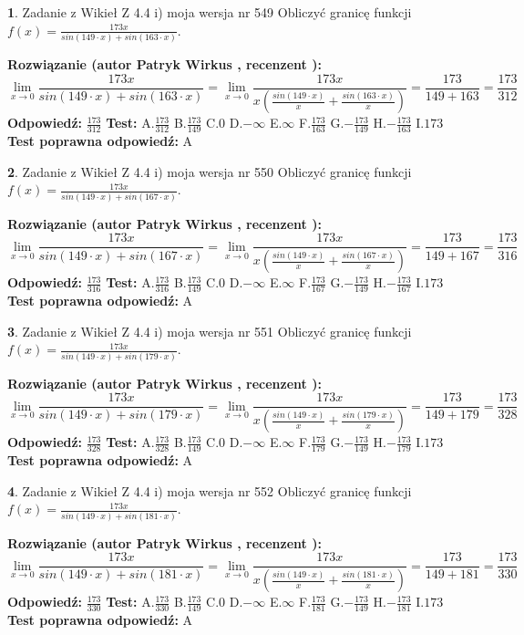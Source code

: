 \documentclass[12pt, a4paper]{article}
\theoremstyle{definition} %
\newtheorem{zad}{}
\newcommand{\zadStart}[1]{\begin{zad}#1\newline}
\newcommand{\zadStop}{\end{zad}}
\newcommand{\rozwStart}[2]{\noindent \textbf{Rozwiązanie (autor #1 , recenzent #2): }\newline}
\newcommand{\rozwStop}{\newline}
\newcommand{\odpStart}{\noindent \textbf{Odpowiedź:}\newline}
\newcommand{\odpStop}{\newline}
\newcommand{\testStart}{\noindent \textbf{Test:}\newline}
\newcommand{\testStop}{\newline}
\newcommand{\kluczStart}{\noindent \textbf{Test poprawna odpowiedź:}\newline}
\newcommand{\kluczStop}{\newline}
\begin{document}
\zadStart{Zadanie z Wikieł Z 4.4 i) moja wersja nr 549}
Obliczyć granicę funkcji $f(x)=\frac{173x}{sin(149\cdot x) +sin(163\cdot x)}$.
\zadStop
\rozwStart{Patryk Wirkus}{}
$$\lim\limits_{x\to 0}\frac{173x}{sin(149\cdot x) +sin(163\cdot x)}=\lim\limits_{x\to 0}\frac{173x}{x(\frac{sin(149\cdot x)}{x}+\frac{sin(163\cdot x)}{x})}=\frac{173}{149+163} = \frac{173}{312}$$
\rozwStop
\odpStart
$\frac{173}{312}$
\odpStop
\testStart
A.$\frac{173}{312}$
B.$\frac{173}{149}$
C.$0$
D.$-\infty$
E.$\infty$
F.$\frac{173}{163}$
G.$-\frac{173}{149}$
H.$-\frac{173}{163}$
I.$173$
\testStop
\kluczStart
A
\kluczStop



\zadStart{Zadanie z Wikieł Z 4.4 i) moja wersja nr 550}
Obliczyć granicę funkcji $f(x)=\frac{173x}{sin(149\cdot x) +sin(167\cdot x)}$.
\zadStop
\rozwStart{Patryk Wirkus}{}
$$\lim\limits_{x\to 0}\frac{173x}{sin(149\cdot x) +sin(167\cdot x)}=\lim\limits_{x\to 0}\frac{173x}{x(\frac{sin(149\cdot x)}{x}+\frac{sin(167\cdot x)}{x})}=\frac{173}{149+167} = \frac{173}{316}$$
\rozwStop
\odpStart
$\frac{173}{316}$
\odpStop
\testStart
A.$\frac{173}{316}$
B.$\frac{173}{149}$
C.$0$
D.$-\infty$
E.$\infty$
F.$\frac{173}{167}$
G.$-\frac{173}{149}$
H.$-\frac{173}{167}$
I.$173$
\testStop
\kluczStart
A
\kluczStop



\zadStart{Zadanie z Wikieł Z 4.4 i) moja wersja nr 551}
Obliczyć granicę funkcji $f(x)=\frac{173x}{sin(149\cdot x) +sin(179\cdot x)}$.
\zadStop
\rozwStart{Patryk Wirkus}{}
$$\lim\limits_{x\to 0}\frac{173x}{sin(149\cdot x) +sin(179\cdot x)}=\lim\limits_{x\to 0}\frac{173x}{x(\frac{sin(149\cdot x)}{x}+\frac{sin(179\cdot x)}{x})}=\frac{173}{149+179} = \frac{173}{328}$$
\rozwStop
\odpStart
$\frac{173}{328}$
\odpStop
\testStart
A.$\frac{173}{328}$
B.$\frac{173}{149}$
C.$0$
D.$-\infty$
E.$\infty$
F.$\frac{173}{179}$
G.$-\frac{173}{149}$
H.$-\frac{173}{179}$
I.$173$
\testStop
\kluczStart
A
\kluczStop



\zadStart{Zadanie z Wikieł Z 4.4 i) moja wersja nr 552}
Obliczyć granicę funkcji $f(x)=\frac{173x}{sin(149\cdot x) +sin(181\cdot x)}$.
\zadStop
\rozwStart{Patryk Wirkus}{}
$$\lim\limits_{x\to 0}\frac{173x}{sin(149\cdot x) +sin(181\cdot x)}=\lim\limits_{x\to 0}\frac{173x}{x(\frac{sin(149\cdot x)}{x}+\frac{sin(181\cdot x)}{x})}=\frac{173}{149+181} = \frac{173}{330}$$
\rozwStop
\odpStart
$\frac{173}{330}$
\odpStop
\testStart
A.$\frac{173}{330}$
B.$\frac{173}{149}$
C.$0$
D.$-\infty$
E.$\infty$
F.$\frac{173}{181}$
G.$-\frac{173}{149}$
H.$-\frac{173}{181}$
I.$173$
\testStop
\kluczStart
A
\kluczStop
\end{document}

